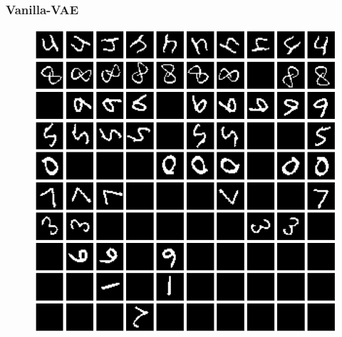 \begin{frame}
\frametitle{Vanilla-VAE}
\begin{figure}[h!]
	\begin{minipage}{0.32\textwidth}
		\hfill
		\includegraphics[scale=0.12]{Bilder/rotatingMNIST_VAE}
	\end{minipage}
	\begin{minipage}{0.32\textwidth}
		\hfill
	\end{minipage}
	\begin{minipage}{0.32\textwidth}
		\hfill
	\end{minipage}
	

\end{figure}
\end{frame}
